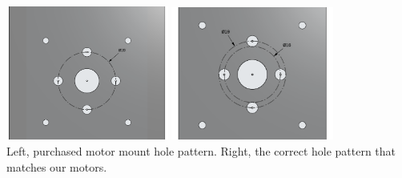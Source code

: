 \documentclass{iopart}
\begin{document}
\begin{center}
    \includegraphics[width=0.4\textwidth]{graphics/wrong_holes.png}
    \includegraphics[width=0.4\textwidth]{graphics/right_holes.png}\\
    Left, purchased motor mount hole pattern. Right, the correct hole pattern that matches our motors.
\end{center}
\end{document}
